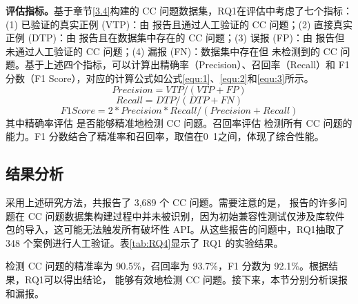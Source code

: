 \textbf{评估指标。}基于章节\ref{3.4}构建的 CC 问题数据集，RQ1在评估中考虑了七个指标：(1) 已验证的真实正例 (VTP)：由 \tool{} 报告且通过人工验证的 CC 问题；(2) 直接真实正例 (DTP)：由 \tool{} 报告且在数据集中存在的 CC 问题；(3) 误报 (FP)：由 \tool{} 报告但未通过人工验证的 CC 问题；(4) 漏报 (FN)：数据集中存在但 \tool{} 未检测到的 CC 问题。基于上述四个指标，可以计算出精确率（Precision）、召回率（Recall）和 F1 分数（F1 Score），对应的计算公式如公式\ref{equ:1}、\ref{equ:2}和\ref{equ:3}所示。
\begin{equation}
	\label{equ:1}
	Precision = VTP / (VTP + FP)
\end{equation}
\begin{equation}
	\label{equ:2}
	Recall = DTP / (DTP + FN)
\end{equation}
\begin{equation}
	\label{equ:3}
	F1 Score =2 * Precision * Recall / ( Precision + Recall)
\end{equation}
其中精确率评估\tool{} 是否能够精准地检测 CC 问题。召回率评估\tool{} 检测所有 CC 问题的能力。F1 分数结合了精准率和召回率，取值在0~1之间，体现了综合性能。

\subsection{结果分析}
采用上述研究方法，\tool{}共报告了 3,689 个 CC 问题。需要注意的是，\tool{} 报告的许多问题在 CC 问题数据集构建过程中并未被识别，因为初始兼容性测试仅涉及库软件包的导入，这可能无法触发所有破坏性 API。从这些报告的问题中，RQ1抽取了 348 个案例进行人工验证。表\ref{tab:RQ4}显示了 RQ1 的实验结果。

\tool{} 检测 CC 问题的精准率为 90.5\%，召回率为 93.7\%，F1 分数为 92.1\%。根据结果，RQ1可以得出结论，\tool{} 能够有效地检测 CC 问题。接下来，本节分别分析误报和漏报。

